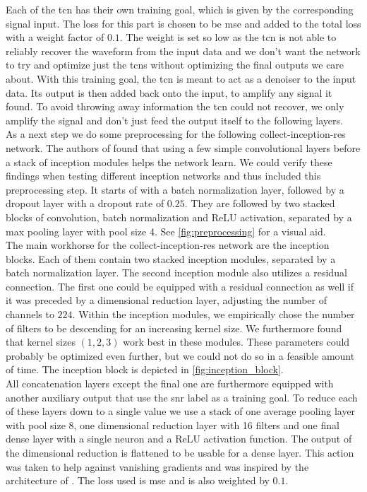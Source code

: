 Each of the \gls{tcn} has their own training goal, which is given by the corresponding signal input. The loss for this part is chosen to be \gls{mse} and added to the total loss with a weight factor of $0.1$. The weight is set so low as the \gls{tcn} is not able to reliably recover the waveform from the input data and we don't want the network to try and optimize just the \gls{tcn}s without optimizing the final outputs we care about. With this training goal, the \gls{tcn} is meant to act as a denoiser to the input data. Its output is then added back onto the input, to amplify any signal it found. To avoid throwing away information the \gls{tcn} could not recover, we only amplify the signal and don't just feed the output itself to the following layers.\\
As a next step we do some preprocessing for the following collect-inception-res network. The authors of \cite{inception_module} found that using a few simple convolutional layers before a stack of inception modules helps the network learn. We could verify these findings when testing different inception networks and thus included this preprocessing step. It starts of with a batch normalization layer, followed by a dropout layer with a dropout rate of $0.25$. They are followed by two stacked blocks of convolution, batch normalization and ReLU activation, separated by a max pooling layer with pool size 4. See \autoref{fig:preprocessing} for a visual aid.\\
The main workhorse for the collect-inception-res network are the inception blocks. Each of them contain two stacked inception modules, separated by a batch normalization layer. The second inception module also utilizes a residual connection. The first one could be equipped with a residual connection as well if it was preceded by a  dimensional reduction layer, adjusting the number of channels to $224$. Within the inception modules, we empirically chose the number of filters to be descending for an increasing kernel size. We furthermore found that kernel sizes $(1,2,3)$ work best in these modules. These parameters could probably be optimized even further, but we could not do so in a feasible amount of time. The inception block is depicted in \autoref{fig:inception_block}.\\
All concatenation layers except the final one are furthermore equipped with another auxiliary output that use the \gls{snr} label as a training goal. To reduce each of these layers down to a single value we use a stack of one average pooling layer with pool size 8, one dimensional reduction layer with 16 filters and one final dense layer with a single neuron and a ReLU activation function. The output of the dimensional reduction is flattened to be usable for a dense layer. This action was taken to help against vanishing gradients and was inspired by the architecture of \cite{inception_module}. The loss used is \gls{mse} and is also weighted by $0.1$.\\
